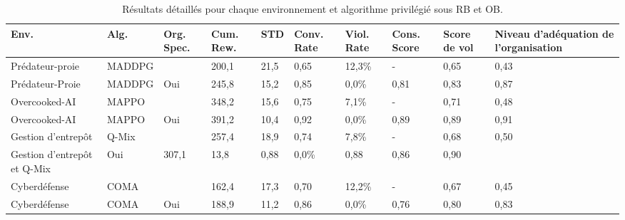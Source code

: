 \begin{table}[h!]
  \centering
  \caption{Résultats détaillés pour chaque environnement et algorithme privilégié sous RB et OB.}
  \label{tab:detailed_results}
  \small
  \renewcommand{\arraystretch}{1.2}
  {%

    \footnotesize
    \begin{tabular}{p{3.5cm}p{1.5cm}p{}p{1.3cm}p{1cm}p{1.3cm}p{1.3cm}p{1.2cm}p{1.2cm}p{1cm}}
      \hline
      \textbf{Env.}               & \textbf{Alg.} & \textbf{Org. Spec.} & \textbf{Cum. Rew.} & \textbf{STD} & \textbf{Conv. Rate} & \textbf{Viol. Rate} & \textbf{Cons. Score} & \textbf{Score de vol} & \textbf{Niveau d'adéquation de l'organisation} \\ \hline
      Prédateur-proie             & MADDPG        &                     & 200,1              & 21,5         & 0,65                & 12,3\%              & -                    & 0,65                  & 0,43                                           \\
      Prédateur-Proie             & MADDPG        & Oui                 & 245,8              & 15,2         & 0,85                & 0,0\%               & 0,81                 & 0,83                  & 0,87                                           \\
      Overcooked-AI               & MAPPO         &                     & 348,2              & 15,6         & 0,75                & 7,1\%               & -                    & 0,71                  & 0,48                                           \\
      Overcooked-AI               & MAPPO         & Oui                 & 391,2              & 10,4         & 0,92                & 0,0\%               & 0,89                 & 0,89                  & 0,91                                           \\
      Gestion d'entrepôt          & Q-Mix         &                     & 257,4              & 18,9         & 0,74                & 7,8\%               & -                    & 0,68                  & 0,50                                           \\
      Gestion d'entrepôt et Q-Mix & Oui           & 307,1               & 13,8               & 0,88         & 0,0\%               & 0,88                & 0,86                 & 0,90                                                                   \\
      Cyberdéfense                & COMA          &                     & 162,4              & 17,3         & 0,70                & 12,2\%              & -                    & 0,67                  & 0,45                                           \\
      Cyberdéfense                & COMA          & Oui                 & 188,9              & 11,2         & 0,86                & 0,0\%               & 0,76                 & 0,80                  & 0,83                                           \\ \hline
    \end{tabular}
  }
\end{table}

